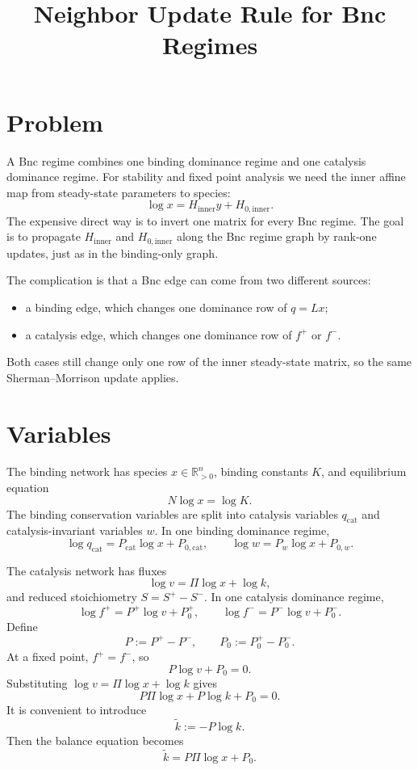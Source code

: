 \documentclass[11pt]{article}
\title{Neighbor Update Rule for Bnc Regimes}
\author{}
\date{}
\newcommand{\logx}{\log x}
\newcommand{\logv}{\log v}
\newcommand{\logk}{\log k}
\begin{document}
\maketitle

\section{Problem}

A Bnc regime combines one binding dominance regime and one catalysis dominance
regime.  For stability and fixed point analysis we need the inner affine map
from steady-state parameters to species:
\[
    \logx = H_{\mathrm{inner}} y + H_{0,\mathrm{inner}} .
\]
The expensive direct way is to invert one matrix for every Bnc regime.  The goal
is to propagate \(H_{\mathrm{inner}}\) and \(H_{0,\mathrm{inner}}\) along the Bnc
regime graph by rank-one updates, just as in the binding-only graph.

The complication is that a Bnc edge can come from two different sources:
\begin{itemize}
    \item a binding edge, which changes one dominance row of \(q=Lx\);
    \item a catalysis edge, which changes one dominance row of \(f^+\) or \(f^-\).
\end{itemize}
Both cases still change only one row of the inner steady-state matrix, so the
same Sherman--Morrison update applies.

\section{Variables}

The binding network has species \(x\in \mathbb{R}_{>0}^n\), binding constants
\(K\), and equilibrium equation
\[
    N\logx=\log K .
\]
The binding conservation variables are split into catalysis variables
\(q_{\mathrm{cat}}\) and catalysis-invariant variables \(w\).  In one binding
dominance regime,
\[
    \log q_{\mathrm{cat}} = P_{\mathrm{cat}}\logx + P_{0,\mathrm{cat}},
    \qquad
    \log w = P_w\logx + P_{0,w}.
\]

The catalysis network has fluxes
\[
    \logv=\Pi\logx+\logk ,
\]
and reduced stoichiometry \(S=S^+-S^-\).  In one catalysis dominance regime,
\[
    \log f^+ = P^+\logv+P_0^+,
    \qquad
    \log f^- = P^-\logv+P_0^- .
\]
Define
\[
    P:=P^+-P^-,
    \qquad
    P_0:=P_0^+-P_0^- .
\]
At a fixed point, \(f^+=f^-\), so
\[
    P\logv+P_0=0 .
\]
Substituting \(\logv=\Pi\logx+\logk\) gives
\[
    P\Pi\logx + P\logk + P_0 = 0 .
\]
It is convenient to introduce
\[
    \tilde k := -P\logk .
\]
Then the balance equation becomes
\[
    \tilde k = P\Pi\logx+P_0 .
\]
\end{document}
